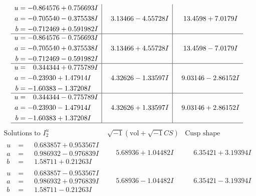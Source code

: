 \documentclass[1p]{elsarticle_modified}
\theoremstyle{definition}
\newcommand{\I}{\sqrt{-1}}
\begin{document}
$$\begin{array}{c|c|c}
\begin{aligned}
u &= -0.864576 + 0.756693 I \\
a &= -0.705540 - 0.375538 I \\
b &= -0.712469 + 0.591982 I\end{aligned}
 & \phantom{-}3.13466 - 4.55728 I & \phantom{-}13.4598 + 7.0179 I \\ \hline\begin{aligned}
u &= -0.864576 - 0.756693 I \\
a &= -0.705540 + 0.375538 I \\
b &= -0.712469 - 0.591982 I\end{aligned}
 & \phantom{-}3.13466 + 4.55728 I & \phantom{-}13.4598 - 7.0179 I \\ \hline\begin{aligned}
u &= \phantom{-}0.344344 + 0.775789 I \\
a &= -0.23930 + 1.47914 I \\
b &= -1.60383 - 1.37208 I\end{aligned}
 & \phantom{-}4.32626 - 1.33597 I & \phantom{-}9.03146 - 2.86152 I \\ \hline\begin{aligned}
u &= \phantom{-}0.344344 - 0.775789 I \\
a &= -0.23930 - 1.47914 I \\
b &= -1.60383 + 1.37208 I\end{aligned}
 & \phantom{-}4.32626 + 1.33597 I & \phantom{-}9.03146 + 2.86152 I\\
 \hline 
 \end{array}$$\newpage$$\begin{array}{c|c|c}  
\text{Solutions to }I^u_{2}& \I (\text{vol} + \sqrt{-1}CS) & \text{Cusp shape}\\
 \hline 
\begin{aligned}
u &= \phantom{-}0.683857 + 0.953567 I \\
a &= \phantom{-}0.986932 - 0.976839 I \\
b &= \phantom{-}1.58711 + 0.21263 I\end{aligned}
 & \phantom{-}5.68936 + 1.04482 I & \phantom{-}6.35421 + 3.19394 I \\ \hline\begin{aligned}
u &= \phantom{-}0.683857 - 0.953567 I \\
a &= \phantom{-}0.986932 + 0.976839 I \\
b &= \phantom{-}1.58711 - 0.21263 I\end{aligned}
 & \phantom{-}5.68936 - 1.04482 I & \phantom{-}6.35421 - 3.19394 I \\ \hline\begin{aligned}

\end{aligned}
\end{array}$$
\end{document}
